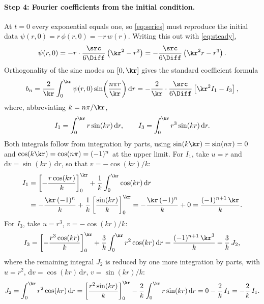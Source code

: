 \paragraph{Step 4: Fourier coefficients from the initial condition.}
At $t = 0$ every exponential equals one, so \cref{eq:series} must reproduce the
initial data $\psi(r,0) = r\,\phi(r,0) = -r\,w(r)$. Writing this out with
\cref{eq:steady},
%
\begin{equation}
  \psi(r,0) = -r \cdot \frac{\src}{6\Diff}\left( \kr^{2} - r^{2} \right)
  = -\frac{\src}{6\Diff}\left( \kr^{2} r - r^{3} \right) .
\end{equation}
%
Orthogonality of the sine modes on $[0,\kr]$ gives the standard coefficient formula
%
\begin{equation}
  b_{n} = \frac{2}{\kr} \int_{0}^{\kr} \psi(r,0)
  \sin\!\left( \frac{n\pi r}{\kr} \right) \mathrm{d}r
  = -\frac{2}{\kr}\cdot\frac{\src}{6\Diff}
  \left[ \kr^{2} I_{1} - I_{3} \right] ,
  \label{eq:bn-def}
\end{equation}
%
where, abbreviating $k = n\pi/\kr$,
%
\begin{equation}
  I_{1} = \int_{0}^{\kr} r \sin(kr)\,\mathrm{d}r , \qquad
  I_{3} = \int_{0}^{\kr} r^{3} \sin(kr)\,\mathrm{d}r .
\end{equation}
%
Both integrals follow from integration by parts, using
$\sin(k\kr) = \sin(n\pi) = 0$ and $\cos(k\kr) = \cos(n\pi) = (-1)^{n}$ at the upper
limit. For $I_{1}$, take $u = r$ and $\mathrm{d}v = \sin(kr)\,\mathrm{d}r$, so that
$v = -\cos(kr)/k$:
%
\begin{align}
  I_{1}
  &= \left[ -\frac{r\cos(kr)}{k} \right]_{0}^{\kr}
   + \frac{1}{k}\int_{0}^{\kr} \cos(kr)\,\mathrm{d}r \notag \\
  &= -\frac{\kr\,(-1)^{n}}{k} + \frac{1}{k}\left[ \frac{\sin(kr)}{k} \right]_{0}^{\kr}
  = -\frac{\kr\,(-1)^{n}}{k} + 0
  = \frac{(-1)^{n+1}\,\kr}{k} .
  \label{eq:I1}
\end{align}
%
For $I_{3}$, take $u = r^{3}$, $v = -\cos(kr)/k$:
%
\begin{equation}
  I_{3}
  = \left[ -\frac{r^{3}\cos(kr)}{k} \right]_{0}^{\kr}
   + \frac{3}{k}\int_{0}^{\kr} r^{2}\cos(kr)\,\mathrm{d}r
  = \frac{(-1)^{n+1}\,\kr^{3}}{k} + \frac{3}{k}\,J_{2} ,
\end{equation}
%
where the remaining integral $J_{2}$ is reduced by one more integration by parts,
with $u = r^{2}$, $\mathrm{d}v = \cos(kr)\,\mathrm{d}r$, $v = \sin(kr)/k$:
%
\begin{equation}
  J_{2} = \int_{0}^{\kr} r^{2}\cos(kr)\,\mathrm{d}r
  = \left[ \frac{r^{2}\sin(kr)}{k} \right]_{0}^{\kr}
   - \frac{2}{k}\int_{0}^{\kr} r\sin(kr)\,\mathrm{d}r
  = 0 - \frac{2}{k}\,I_{1}
  = -\frac{2}{k}\,I_{1} .
\end{equation}
